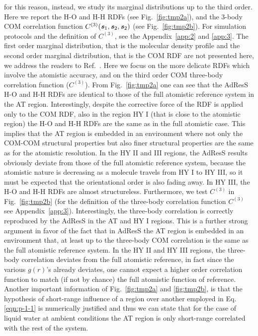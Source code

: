 \documentclass[aip,jcp,a4paper,reprint,onecolumn]{revtex4-1}
\newcommand{\redc}[1]{{\color{red} #1}}
\newcommand{\bluec}[1]{{\color{blue} #1}}
\newcommand{\vect}[1]{\textbf{\textit{#1}}}
\newcommand{\corr}{C^{(3)}}
\begin{document}
for this reason, instead, we study its marginal distributions up to the third order.
Here we report the H-O and H-H RDFs (see Fig.~\ref{fig:tmp2a}), and the 3-body \bluec{COM correlation function
$\corr(\vect s_1, \vect s_2, \vect s_2)$} (see Fig.~\ref{fig:tmp2b}). For simulation
protocols and the definition of \redc{$\corr$}, see the Appendix~\ref{app:2} and \ref{app:3}.
The first order marginal distribution, that is the molecular density profile and the second order marginal distribution, that is the COM RDF are not presented here, we address the readers to Ref.~. 
Here we focus on the more delicate RDFs which involve the atomistic accuracy, and on the third order COM three-body \redc{correlation function} ($\corr$). From Fig.~\ref{fig:tmp2a} one can see that
the AdResS H-O and H-H RDFs are identical to those of 
the full atomistic reference system in the AT region.
Interestingly, despite the corrective force of the \bluec{RDF} is applied only to the COM RDF, also in the region HY I (that is close to the atomistic region) the H-O and H-H RDFs are the same as in the full atomistic case.
This implies that the AT region
is embedded in an environment where not only the COM-COM structural properties but also finer structural
properties are the same as for the atomistic resolution.
In the HY II and III regions, the AdResS results obviously deviate from those
of the full atomistic reference system, because the atomistic nature 
is decreasing as a molecule travels from HY I to HY III, so it must be expected 
that the orientational order is also fading away. In HY III, the H-O and H-H
RDFs are \bluec{almost} structureless.
Furthermore, we test $\corr$ in Fig.~\ref{fig:tmp2b} (for the definition of the three-body \redc{correlation function $\corr$} see Appendix~\ref{app:3}).
Interestingly, the three-body correlation is correctly reproduced
by the AdResS in the AT and HY I  regions. This is a further strong argument in favor of the fact that in AdResS the AT region is embedded in an environment that, at least up to the three-body COM correlation is the same as the full atomistic reference system.
In the HY II and HY III regions, the three-body correlation deviates from the
full atomistic reference, \redc{in fact since the various $g(r)$'s already deviates, one cannot expect a higher order correlation function to match (if not by chance) the full atomistic function of reference}.
Another important information of Fig.~\ref{fig:tmp2a} and \ref{fig:tmp2b},
is that the hypothesis of short-range influence of a region over another employed in Eq.\ref{eqn:p-1-1} is numerically justified and thus we can state that for the case of liquid water at ambient conditions the AT region is only short-range
correlated with the rest of the system.
\end{document}
